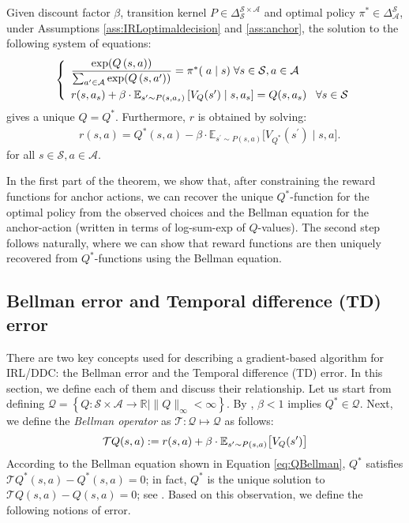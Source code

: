 \begin{thm}\label{thm:MagnacThesmar}%

Given discount factor $\beta$, transition kernel $P\in \Delta_\mathcal{S}^{\mathcal{S}\times \mathcal{A}}$ and optimal policy $\pi^*\in\Delta_\mathcal{A}^{\mathcal{S}}$, under Assumptions \ref{ass:IRLoptimaldecision} and \ref{ass:anchor}, the solution to the following system of equations:
\begin{equation}
\left\{
\begin{array}{l}
    \dfrac{\exp({Q}\left(s,a\right))}{\sum_{a^\prime\in \mathcal{A}} \exp({Q}\left(s,a^\prime\right))} = \pi^*(\;a
    \mid s) \; \forall s\in \mathcal{S}, a\in\mathcal{A}
    \\[1em]
    r(s, a_s)+\beta \cdot \mathbb{E}_{s^{\prime} \sim P(s, a_s)}\left[V_Q(s^\prime) \mid s, a_s\right]  = Q(s, a_s)          \;\; \; \forall s\in \mathcal{S} \notag
\end{array}
\right.
\label{eq:HotzMillereqs}
\end{equation}
gives a unique $Q=Q^*$. Furthermore, $r$ is obtained by solving:
\begin{align}
    &r(s,a) = Q^\ast(s, a) - \beta \cdot \mathbb{E}_{s^{\prime} \sim P(s, a)}\bigl[V_{Q^\ast}(s^\prime) \mid s, a\bigr]. \label{eq:rbyBellman}
\end{align}
for all $ s\in \mathcal{S}, a\in\mathcal{A}$.
\end{thm}

In the first part of the theorem, we show that, after constraining the reward functions for anchor actions, we can recover the unique $Q^\ast$-function for the optimal policy from the observed choices and the Bellman equation for the anchor-action (written in terms of log-sum-exp of $Q$-values). The second step follows naturally, where we can show that reward functions are then uniquely recovered from $Q^*$-functions using the Bellman equation.

\subsection{Bellman error and Temporal difference (TD) error}\label{sec:BE&TD}
There are two key concepts used for describing a gradient-based algorithm for IRL/DDC: the Bellman error and the Temporal difference (TD) error. In this section, we define each of them and discuss their relationship. Let us start from defining $\mathcal{Q}=\left\{Q: \mathcal{S} \times \mathcal{A} \rightarrow \mathbb{R} \mid\|Q\|_{\infty}<\infty\right\}$. By \citet{rust1994structural}, $\beta<1$ implies $Q^* \in \mathcal{Q}$. Next, we define the \textit{Bellman operator} as $\mathcal{T}: \mathcal{Q} \mapsto \mathcal{Q}$ as follows:
$$\mathcal{T}Q(s, a) \notag := r(s, a) + \beta \cdot \mathbb{E}_{s' \sim P(s, a)} \bigl[ V_Q(s') \bigr]
$$
According to the Bellman equation shown in Equation \eqref{eq:QBellman}, $Q^*$ satisfies $\mathcal{T}Q^*(s, a) - Q^*(s, a)=0$; in fact, $Q^*$ is the unique solution to $\mathcal{T}Q(s, a) - Q(s, a)=0$; see \citep{rust1994structural}. 
Based on this observation, we define the following notions of error. 


